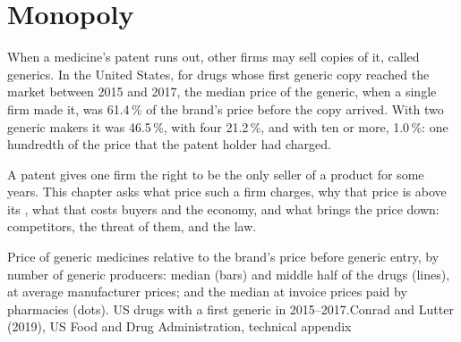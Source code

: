 \chapter{Monopoly}\label{ch:g11:monopoly}

When a medicine's patent runs out, other firms may sell copies of it, called generics. In the United States, for drugs whose first generic copy
reached the market between 2015 and 2017, the median price of the generic, when a single firm made it, was 61.4\,\% of the brand's price before the
copy arrived. With two generic makers it was 46.5\,\%, with four 21.2\,\%, and with ten or more, 1.0\,\%: one hundredth of the price that the patent
holder had charged.

A patent gives one firm the right to be the only seller of a product for some years. This chapter asks what price such a firm charges, why that
price is above its , what that costs buyers and the economy, and what brings the price down: competitors, the threat of them, and the law.

\begin{openingchart}{Price of generic medicines relative to the brand's price before generic entry, by number of generic producers: median (bars) and middle half
of the drugs (lines), at average manufacturer prices; and the median at invoice prices paid by pharmacies (dots). US drugs with a first generic in 2015--2017.}{Conrad and
Lutter (2019), US Food and Drug Administration, technical appendix}
\end{openingchart}

